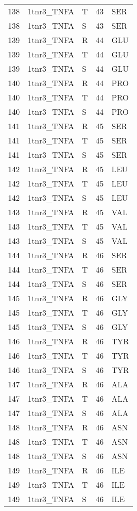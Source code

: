 \begin{longtable}[l]{l|l|l|l|l}
	138 & 1tnr3_TNFA & T & 43 & SER \\
	138 & 1tnr3_TNFA & S & 43 & SER \\
	139 & 1tnr3_TNFA & R & 44 & GLU \\
	139 & 1tnr3_TNFA & T & 44 & GLU \\
	139 & 1tnr3_TNFA & S & 44 & GLU \\
	140 & 1tnr3_TNFA & R & 44 & PRO \\
	140 & 1tnr3_TNFA & T & 44 & PRO \\
	140 & 1tnr3_TNFA & S & 44 & PRO \\
	141 & 1tnr3_TNFA & R & 45 & SER \\
	141 & 1tnr3_TNFA & T & 45 & SER \\
	141 & 1tnr3_TNFA & S & 45 & SER \\
	142 & 1tnr3_TNFA & R & 45 & LEU \\
	142 & 1tnr3_TNFA & T & 45 & LEU \\
	142 & 1tnr3_TNFA & S & 45 & LEU \\
	143 & 1tnr3_TNFA & R & 45 & VAL \\
	143 & 1tnr3_TNFA & T & 45 & VAL \\
	143 & 1tnr3_TNFA & S & 45 & VAL \\
	144 & 1tnr3_TNFA & R & 46 & SER \\
	144 & 1tnr3_TNFA & T & 46 & SER \\
	144 & 1tnr3_TNFA & S & 46 & SER \\
	145 & 1tnr3_TNFA & R & 46 & GLY \\
	145 & 1tnr3_TNFA & T & 46 & GLY \\
	145 & 1tnr3_TNFA & S & 46 & GLY \\
	146 & 1tnr3_TNFA & R & 46 & TYR \\
	146 & 1tnr3_TNFA & T & 46 & TYR \\
	146 & 1tnr3_TNFA & S & 46 & TYR \\
	147 & 1tnr3_TNFA & R & 46 & ALA \\
	147 & 1tnr3_TNFA & T & 46 & ALA \\
	147 & 1tnr3_TNFA & S & 46 & ALA \\
	148 & 1tnr3_TNFA & R & 46 & ASN \\
	148 & 1tnr3_TNFA & T & 46 & ASN \\
	148 & 1tnr3_TNFA & S & 46 & ASN \\
	149 & 1tnr3_TNFA & R & 46 & ILE \\
	149 & 1tnr3_TNFA & T & 46 & ILE \\
	149 & 1tnr3_TNFA & S & 46 & ILE \\

\end{longtable}
